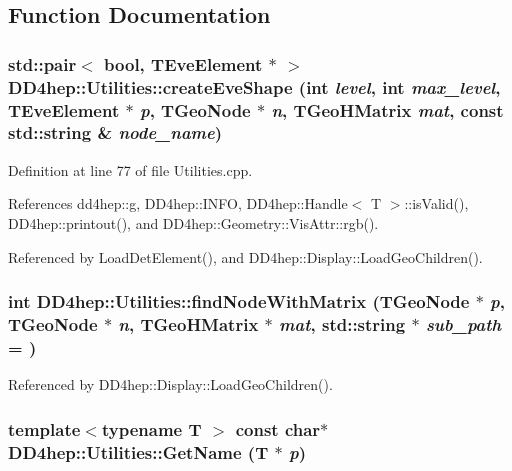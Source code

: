 \subsection{Function Documentation}
\hypertarget{namespace_d_d4hep_1_1_utilities_aa469540c9b22f32d6ac947c4fbe7a7dc}{
\subsubsection[{createEveShape}]{\setlength{\rightskip}{0pt plus 5cm}std::pair$<$ bool, TEveElement $\ast$ $>$ DD4hep::Utilities::createEveShape (int {\em level}, \/  int {\em max\_\-level}, \/  TEveElement $\ast$ {\em p}, \/  TGeoNode $\ast$ {\em n}, \/  TGeoHMatrix {\em mat}, \/  const std::string \& {\em node\_\-name})}}
\label{namespace_d_d4hep_1_1_utilities_aa469540c9b22f32d6ac947c4fbe7a7dc}


Definition at line 77 of file Utilities.cpp.

References dd4hep::g, DD4hep::INFO, DD4hep::Handle$<$ T $>$::isValid(), DD4hep::printout(), and DD4hep::Geometry::VisAttr::rgb().

Referenced by LoadDetElement(), and DD4hep::Display::LoadGeoChildren().\hypertarget{namespace_d_d4hep_1_1_utilities_a61171c4258ed951d93ba11763da066fc}{
\subsubsection[{findNodeWithMatrix}]{\setlength{\rightskip}{0pt plus 5cm}int DD4hep::Utilities::findNodeWithMatrix (TGeoNode $\ast$ {\em p}, \/  TGeoNode $\ast$ {\em n}, \/  TGeoHMatrix $\ast$ {\em mat}, \/  std::string $\ast$ {\em sub\_\-path} = {})}}
\label{namespace_d_d4hep_1_1_utilities_a61171c4258ed951d93ba11763da066fc}


Referenced by DD4hep::Display::LoadGeoChildren().\hypertarget{namespace_d_d4hep_1_1_utilities_a966a7057d7655c50273dc41d229ae315}{
\subsubsection[{GetName}]{\setlength{\rightskip}{0pt plus 5cm}template$<$typename T $>$ const char$\ast$ DD4hep::Utilities::GetName ({\bf T} $\ast$ {\em p})}}
\label{namespace_d_d4hep_1_1_utilities_a966a7057d7655c50273dc41d229ae315}


